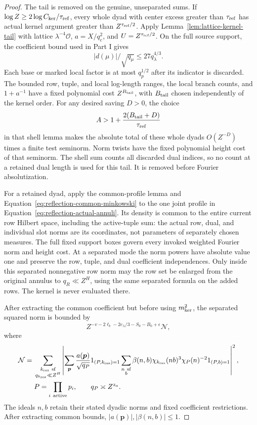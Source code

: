 \documentclass[11pt,a4paper]{article}
\numberwithin{equation}{section}
\numberwithin{figure}{section}
\theoremstyle{definition}
\theoremstyle{remark}
\begin{document}
\begin{proof}
The tail is removed on the genuine, unseparated sums.  If
\(\log Z\ge2\log C_{\rm ker}/\tau_{\rm ref}\), every whole dyad with center
excess greater than \(\tau_{\rm ref}\) has actual kernel argument greater
than \(Z^{\tau_{\rm ref}/2}\).  Apply Lemma~\ref{lem:lattice-kernel-tail}
with lattice \(\lambda^{-4}\mathcal O\),
\(a=X/q_c^2\), and \(U=Z^{\tau_{\rm ref}/2}\).  On the full source support,
the coefficient bound used in Part I gives
\[
 |d(\mu)|/\sqrt{q_\mu}\le27q_\lambda^{4/3}.
\]
Each base or marked local factor is at most \(q_p^{1/2}\) after its
indicator is discarded.  The bounded row, tuple, and local log-length ranges,
the local branch counts, and \(1+a^{-1}\) have a fixed polynomial cost
\(Z^{B_{\rm tail}}\), with \(B_{\rm tail}\) chosen independently of the
kernel order.  For any desired saving \(D>0\), the choice
\[
 A>1+\frac{2(B_{\rm tail}+D)}{\tau_{\rm ref}}
\]
in that shell lemma makes the absolute total of these whole dyads
\(O(Z^{-D})\) times a finite test seminorm.  Norm twists have the fixed
polynomial height cost of that seminorm.  The shell sum counts all discarded
dual indices, so no count at a retained dual length is used for this tail.
It is removed before Fourier absolutization.

For a retained dyad, apply the common-profile lemma and
Equation~\eqref{eq:reflection-common-minkowski} to the one joint profile in
Equation~\eqref{eq:reflection-actual-annuli}.  Its density is common to the
entire current row Hilbert space, including the active-tuple sum: the actual
row, dual, and individual slot norms are its coordinates, not parameters of
separately chosen measures.  The full fixed support boxes govern every invoked
weighted Fourier norm and height cost.  At a separated mode the norm powers
have absolute value one and preserve the row, tuple, and dual coefficient
independences.  Only inside this separated nonnegative row norm may the row
set be enlarged from the original annulus to \(q_R\ll Z^H\), using the same
separated formula on the added rows.  The kernel is never evaluated there.

After extracting the common coefficient but before using \(m_{\rm ker}^2\),
the separated squared norm is bounded by
\[
 Z^{-v-2\ell_b-2e_\lambda/3-S_0-B_0+\epsilon}\mathcal N,
\]
where
\begin{equation}\label{old-eq:4.6a}
 \begin{split}
 \mathcal N={}&
 \sum_{\substack{k_{\rm res}\ {\rm sf}\\q_{k_{\rm res}}\ll Z^H}}
 \left|
 \sum_{\boldsymbol p}
 \frac{a(\boldsymbol p)}{\sqrt{q_P}}1_{(P,k_{\rm res})=1}
 \sum_{\substack{n\ {\rm sf}\\b}}
 \beta(n,b)\chi_{k_{\rm res}}(nb)^3
              \chi_P(n)^{-2}1_{(P,b)=1}
 \right|^2,\\
 &P=\prod_{i\ {\rm active}}p_i,\qquad q_P\asymp Z^{z_a}.
 \end{split}
\end{equation}
The ideals \(n,b\) retain their stated dyadic norms and fixed coefficient
restrictions.  After extracting common bounds,
\(|a(\boldsymbol p)|,|\beta(n,b)|\le1\).


\end{proof}
\end{document}
